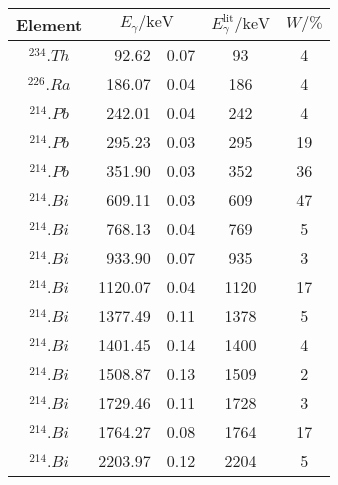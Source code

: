 \label{tab:unbekannt2}
	\begin{tabular}{cr@{${}\pm{}$}lS[table-format=4.0]S[table-format=2.0]}
		\toprule
		{Element} &  & {$E_\gamma^{\text{lit}}/\si{\kilo\electronvolt}$} & {$W/\si{\percent}$} \\
		\midrule
		{$^{234}.{Th}$} & 92.62   & 0.07 &   93 &  4 \\
		{$^{226}.{Ra}$} & 186.07  & 0.04 &  186 &  4 \\
		{$^{214}.{Pb}$} & 242.01  & 0.04 &  242 &  4 \\
		{$^{214}.{Pb}$} & 295.23  & 0.03 &  295 & 19 \\
		{$^{214}.{Pb}$} & 351.90  & 0.03 &  352 & 36 \\
		{$^{214}.{Bi}$} & 609.11  & 0.03 &  609 & 47 \\
		{$^{214}.{Bi}$} & 768.13  & 0.04 &  769 &  5 \\
		{$^{214}.{Bi}$} & 933.90  & 0.07 &  935 &  3 \\
		{$^{214}.{Bi}$} & 1120.07 & 0.04 & 1120 & 17 \\
		{$^{214}.{Bi}$} & 1377.49 & 0.11 & 1378 &  5 \\
		{$^{214}.{Bi}$} & 1401.45 & 0.14 & 1400 &  4 \\
		{$^{214}.{Bi}$} & 1508.87 & 0.13 & 1509 &  2 \\
		{$^{214}.{Bi}$} & 1729.46 & 0.11 & 1728 &  3 \\
		{$^{214}.{Bi}$} & 1764.27 & 0.08 & 1764 & 17 \\
		{$^{214}.{Bi}$} & 2203.97 & 0.12 & 2204 &  5 \\
		\bottomrule
	\end{tabular}
